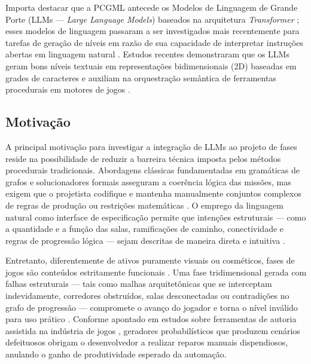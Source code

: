 Importa destacar que a PCGML antecede os Modelos de Linguagem de Grande Porte (LLMs --- \textit{Large Language Models}) baseados na arquitetura \textit{Transformer} \cite{vaswani2017attention, brown2020language, summerville2018procedural}; esses modelos de linguagem passaram a ser investigados mais recentemente para tarefas de geração de níveis em razão de sua capacidade de interpretar instruções abertas em linguagem natural \cite{Gallotta_2024, maleki2024procedural}. Estudos recentes demonstraram que os LLMs geram bons níveis textuais em representações bidimensionais (2D) baseadas em grades de caracteres \cite{todd2023level, nasir2024word2worldgeneratingstoriesworlds, chen2025narrative} e auxiliam na orquestração semântica de ferramentas procedurais em motores de jogos \cite{Gallotta_2024, tang2025unrealllm}.

\subsection{Motivação}
\label{sec:motivacao}

A principal motivação para investigar a integração de LLMs ao projeto de fases reside na possibilidade de reduzir a barreira técnica imposta pelos métodos procedurais tradicionais. Abordagens clássicas fundamentadas em gramáticas de grafos e solucionadores formais asseguram a coerência lógica das missões, mas exigem que o projetista codifique e mantenha manualmente conjuntos complexos de regras de produção ou restrições matemáticas \cite{dormans2010, linden2013designing, linden2014dungeons}. O emprego da linguagem natural como interface de especificação permite que intenções estruturais --- como a quantidade e a função das salas, ramificações de caminho, conectividade e regras de progressão lógica --- sejam descritas de maneira direta e intuitiva \cite{Gallotta_2024, wang2026designerlyloop}.

Entretanto, diferentemente de ativos puramente visuais ou cosméticos, fases de jogos são conteúdos estritamente funcionais \cite{summerville2018procedural, linden2014dungeons}. Uma fase tridimensional gerada com falhas estruturais --- tais como malhas arquitetônicas que se interceptam indevidamente, corredores obstruídos, salas desconectadas ou contradições no grafo de progressão --- compromete o avanço do jogador e torna o nível inválido para uso prático \cite{linden2014dungeons, xu2025constraint}. Conforme apontado em estudos sobre ferramentas de autoria assistida na indústria de jogos \cite{lai2020towards, walton2020evaluating, bandeali2026generative}, geradores probabilísticos que produzem cenários defeituosos obrigam o desenvolvedor a realizar reparos manuais dispendiosos, anulando o ganho de produtividade esperado da automação.

